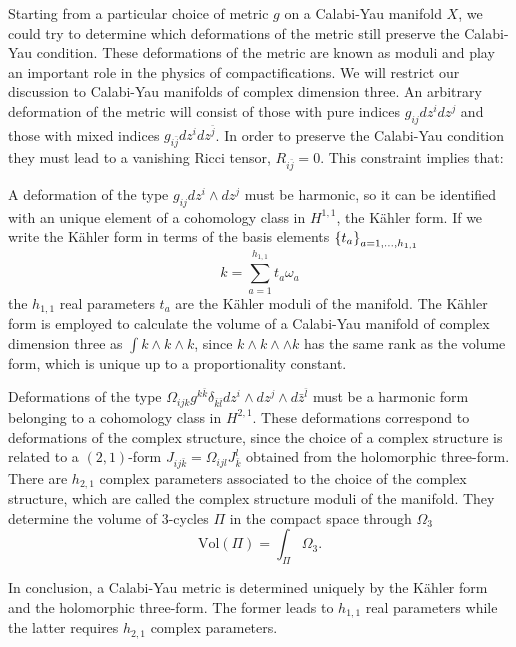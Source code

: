 Starting from a particular choice of metric $g$ on a Calabi-Yau manifold $X$, we could try to determine
which deformations of the metric still preserve the Calabi-Yau condition.
These deformations of the metric are known as moduli and play an important role in the physics of compactifications.
We will restrict our discussion to Calabi-Yau manifolds of complex dimension three.
An arbitrary deformation of the metric will consist of those with pure 
indices $g_{ij}dz^i dz^j$ and those with mixed indices $g_{i\bar j}dz^i dz^{\bar j}$.
In order to preserve the Calabi-Yau condition they must lead to a vanishing Ricci tensor, $R_{i\bar j}=0$.
This constraint implies that:

 A deformation of the type $g_{ij}dz^i \wedge dz^j$ must be harmonic, so it can be identified with an unique element of a cohomology class in $H^{1,1}$, the Kähler form.
 If we write the Kähler form in terms of the basis elements $\qty{t_a}_{a=1,\ldots,h_{1,1}}$
\begin{equation}
k=\sum_{a=1}^{h_{1,1}}t_a \omega_a
\end{equation}
the $h_{1,1}$ real parameters $t_a$ are the Kähler moduli of the manifold.
The Kähler form is employed to calculate the volume of a Calabi-Yau manifold of complex dimension three as
$\int k\wedge k\wedge k$, since $k\wedge k\wedge \wedge k$ has the same rank as the
volume form, which is unique up to a proportionality constant.

Deformations of the type $\Omega_{ijk}g^{k\bar k}\delta_{\bar k\bar l}dz^i\wedge dz^j \wedge d\bar z^{\bar l}$ must be a harmonic form belonging to a cohomology class in $H^{2,1}$.
These deformations correspond to deformations of the complex structure, 
since the choice of a complex structure is related to a $(2,1)$-form  $J_{ij\bar k}= \Omega_{ijl}J^l_{\bar k}$ 
obtained from the holomorphic three-form.
There are $h_{2,1}$ complex parameters associated to the choice of the complex structure, which are called the complex structure moduli of the manifold.
They determine the volume of 3-cycles $\Pi$ in the compact space through $\Omega_3$ 
\begin{equation}
  \mathrm{Vol}(\Pi)=\int_\Pi \Omega_3.
\end{equation}

In conclusion, a Calabi-Yau metric is determined uniquely by the Kähler form and the holomorphic three-form.
The former leads to $h_{1,1}$ real parameters while the latter requires $h_{2,1}$ complex parameters.


